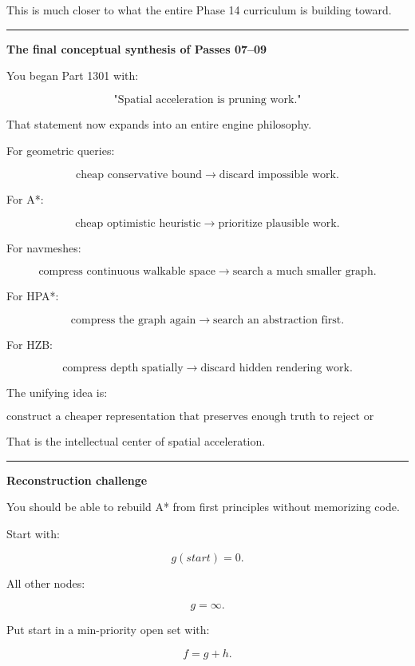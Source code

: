 This is much closer to what the entire Phase 14 curriculum is building toward.

\begin{center}\rule{0.5\linewidth}{0.5pt}\end{center}

\textbf{The final conceptual synthesis of Passes 07--09}

You began Part 1301 with:

\[
\text{"Spatial acceleration is pruning work."}
\]

That statement now expands into an entire engine philosophy.

For geometric queries:

\[
\text{cheap conservative bound}
\rightarrow
\text{discard impossible work}.
\]

For A*:

\[
\text{cheap optimistic heuristic}
\rightarrow
\text{prioritize plausible work}.
\]

For navmeshes:

\[
\text{compress continuous walkable space}
\rightarrow
\text{search a much smaller graph}.
\]

For HPA*:

\[
\text{compress the graph again}
\rightarrow
\text{search an abstraction first}.
\]

For HZB:

\[
\text{compress depth spatially}
\rightarrow
\text{discard hidden rendering work}.
\]

The unifying idea is:

\[
\boxed{
\text{construct a cheaper representation that preserves enough truth to reject or postpone expensive computation.}
}
\]

That is the intellectual center of spatial acceleration.

\begin{center}\rule{0.5\linewidth}{0.5pt}\end{center}

\textbf{Reconstruction challenge}

You should be able to rebuild A* from first principles without memorizing code.

Start with:

\[
g(start)=0.
\]

All other nodes:

\[
g=\infty.
\]

Put start in a min-priority open set with:

\[
f=g+h.
\]

